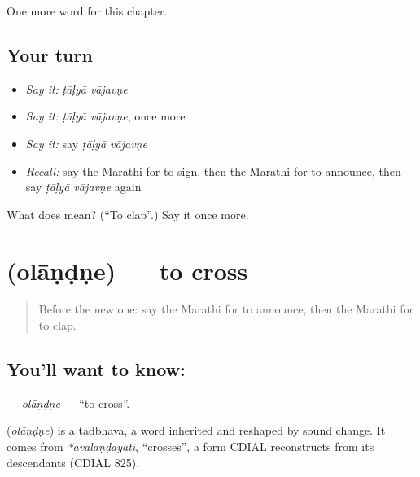 \begin{grammarlens}[title={What you've built}]
One more word for this chapter.
\end{grammarlens}

\subsection*{Your turn}
\begin{itemize}
\raggedright
  \item \emph{Say it:} \emph{ṭāḷyā vājavṇe}
  \item \emph{Say it:} \emph{ṭāḷyā vājavṇe}, once more
  \item \emph{Say it:} say \emph{ṭāḷyā vājavṇe}
  \item \emph{Recall:} say the Marathi for to sign, then the Marathi for to announce, then say \emph{ṭāḷyā vājavṇe} again
\end{itemize}

\begin{tcolorbox}[breakable,colback=teal!4,colframe=teal!35!black,title={Before you move on}]
What does   mean? (\textquotedblleft{}To clap\textquotedblright{}.) Say it once more.
\end{tcolorbox}
\section[\texorpdfstring{\mr{ओलांडणे} (olāṇḍṇe)}{ओलांडणे (olāṇḍṇe)}]{ (olāṇḍṇe) — to cross}

\label{lesson:MR-C164-olandne}



\begin{quote}
Before the new one: say the Marathi for to announce, then the Marathi for to clap.
\end{quote}

\subsection*{You'll want to know: }
\textbf{} — \emph{olāṇḍṇe} — \textquotedblleft{}to cross\textquotedblright{}.

\begin{cousinweb}
\textbf{} (\emph{olāṇḍṇe}) is a tadbhava, a word inherited and reshaped by sound change. It comes from \emph{*avalaṇḍayati}, \textquotedblleft{}crosses\textquotedblright{}, a form CDIAL reconstructs from its descendants (CDIAL 825).
\end{cousinweb}

